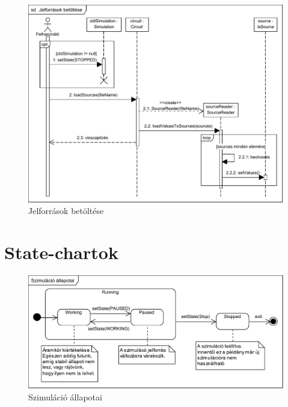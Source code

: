 \begin{figure}[H]
\begin{center}
\includegraphics[angle=90]{chapters/chapter03/seqdiagrams/jelforrasok_betoltese.pdf}
\caption{Jelforrások betöltése}
\label{fig:jelforrasok_betoltese}
\end{center}
\end{figure}

\section{State-chartok}

\begin{figure}[h]
\begin{center}
\includegraphics{chapters/chapter03/seqdiagrams/sim_states.pdf}
\caption{Szimuláció állapotai}
\label{fig:sim_states}
\end{center}
\end{figure}
